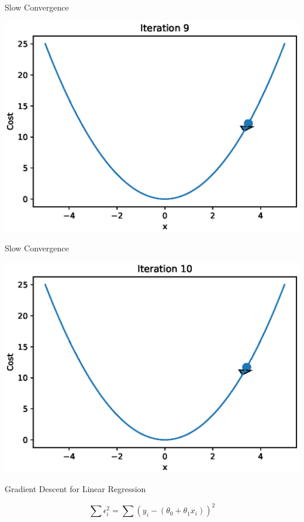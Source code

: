 \documentclass{beamer}
\begin{document}
\begin{frame}{Slow Convergence}
  \begin{center}
       \includegraphics[totalheight=6cm]{gradient-descent/undershooting-9.eps}
   \end{center}
\end{frame}

\begin{frame}{Slow Convergence}
  \begin{center}
       \includegraphics[totalheight=6cm]{gradient-descent/undershooting-10.eps}
   \end{center}
\end{frame}




\begin{frame}{Gradient Descent for Linear Regression}

\begin{equation*}
    \sum \epsilon_{i}^{2} = \sum (y_{i} - (\theta_{0} + \theta_{1}x_{i}))^{2}
\end{equation*}

\end{frame}
\end{document}
